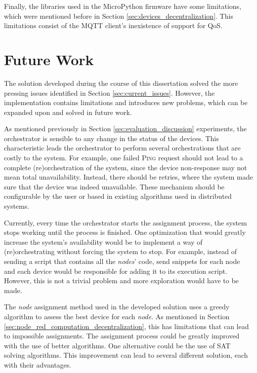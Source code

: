 Finally, the libraries used in the MicroPython firmware have some limitations, which were mentioned before in Section \ref{sec:devices_decentralization}. This limitations consist of the MQTT client's inexistence of support for QoS.

\section{Future Work}\label{sec:future_work}

The solution developed during the course of this dissertation solved the more pressing issues identified in Section \ref{sec:current_issues}. However, the implementation contains limitations and introduces new problems, which can be expanded upon and solved in future work.

As mentioned previously in Section \ref{sec:evaluation_discussion} experiments, the orchestrator is sensible to any change in the status of the devices. This characteristic leads the orchestrator to perform several orchestrations that are costly to the system. For example, one failed \textsc{Ping} request should not lead to a complete (re)orchestration of the system, since the device non-response may not mean total unavailability. Instead, there should be retries, where the system made sure that the device was indeed unavailable. These mechanism should be configurable by the user or based in existing algorithms used in distributed systems.

Currently, every time the orchestrator starts the assignment process, the system stops working until the process is finished. One optimization that would greatly increase the system's availability would be to implement a way of (re)orchestrating without forcing the system to stop. For example, instead of sending a script that contains all the \textit{nodes}' code, send snippets for each node and each device would be responsible for adding it to its execution script. However, this is not a trivial problem and more exploration would have to be made.

The \textit{node} assignment method used in the developed solution uses a greedy algorithm to assess the best device for each \textit{node}. As mentioned in Section \ref{sec:node_red_computation_decentralization}, this has limitations that can lead to impossible assignments. The assignment process could be greatly improved with the use of better algorithms. One alternative could be the use of SAT solving algorithms. This improvement can lead to several different solution, each with their advantages.

